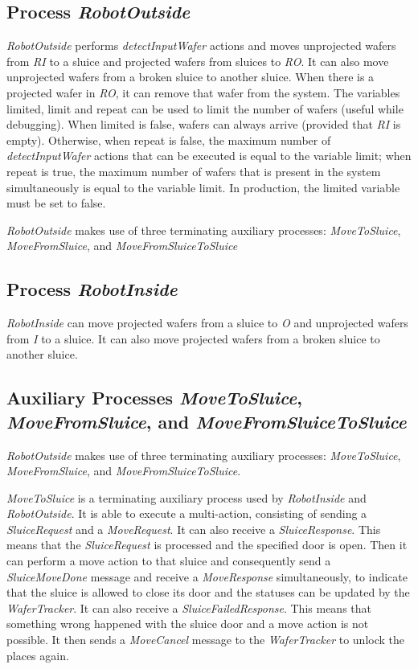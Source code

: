 \subsection{Process \emph{RobotOutside}}

 \emph{RobotOutside} performs \emph{detectInputWafer} actions and moves unprojected wafers
 from \emph{RI} to a sluice and projected wafers from sluices to \emph{RO}. It can also
 move unprojected wafers from a broken sluice to another sluice. When there
 is a projected wafer in \emph{RO}, it can remove that wafer from the system. The
 variables limited, limit and repeat can be used to limit the number of
 wafers (useful while debugging). When limited is false, wafers can always
 arrive (provided that \emph{RI} is empty). Otherwise, when repeat is false, the
 maximum number of \emph{detectInputWafer} actions that can be executed is equal to
 the variable limit; when repeat is true, the maximum number of wafers that
 is present in the system simultaneously is equal to the variable limit.
 In production, the limited variable must be set to false.
 
 \emph{RobotOutside} makes use of three terminating auxiliary processes: \emph{MoveToSluice}, \emph{MoveFromSluice}, and \emph{MoveFromSluiceToSluice}
 
\subsection{Process \emph{RobotInside}}

 \emph{RobotInside} can move projected wafers from a sluice to \emph{O} and unprojected
 wafers from \emph{I} to a sluice. It can also move projected wafers from a broken
 sluice to another sluice.

 \subsection{Auxiliary Processes \emph{MoveToSluice}, \emph{MoveFromSluice}, and \emph{MoveFromSluiceToSluice}}

 \emph{RobotOutside} makes use of three terminating auxiliary processes: \emph{MoveToSluice}, \emph{MoveFromSluice}, and \emph{MoveFromSluiceToSluice}.
 
  \emph{MoveToSluice} is a terminating auxiliary process used by \emph{RobotInside} and
 \emph{RobotOutside}. It is able to execute a multi-action, consisting of sending
 a \emph{SluiceRequest} and a \emph{MoveRequest}. It can also receive a \emph{SluiceResponse}.
 This means that the \emph{SluiceRequest} is processed and the specified door is
 open. Then it can perform a move action to that sluice and consequently
 send a \emph{SluiceMoveDone} message and receive a \emph{MoveResponse} simultaneously, to
 indicate that the sluice is allowed to close its door and the statuses can
 be updated by the \emph{WaferTracker}. It can also receive a \emph{SluiceFailedResponse}.
 This means that something wrong happened with the sluice door and a move
 action is not possible. It then sends a \emph{MoveCancel} message to the
 \emph{WaferTracker} to unlock the places again.



